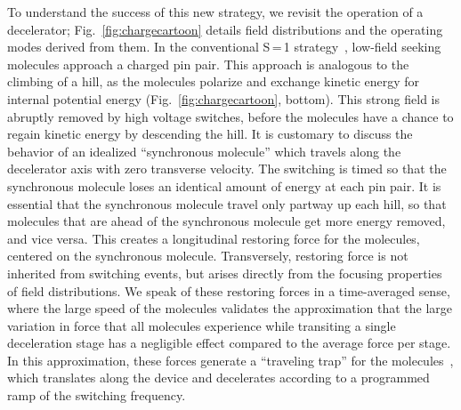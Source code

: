 \documentclass[%
 reprint,
 amsmath,amssymb,
 aps,
prl,
]{revtex4-1}
\begin{document}
To understand the success of this new strategy, we revisit the operation of a decelerator; Fig.~\ref{fig:chargecartoon} details field distributions and the operating modes derived from them.
In the conventional S\,=\,1 strategy~\cite{VanDeMeerakker2012}, low-field seeking molecules approach a charged pin pair. 
This approach is analogous to the climbing of a hill, as the molecules polarize and exchange kinetic energy for internal potential energy (Fig.~\ref{fig:chargecartoon}, bottom).
This strong field is abruptly removed by high voltage switches, before the molecules have a chance to regain kinetic energy by descending the hill.
It is customary to discuss the behavior of an idealized ``synchronous molecule'' which travels along the decelerator axis with zero transverse velocity.
The switching is timed so that the synchronous molecule loses an identical amount of energy at each pin pair.
It is essential that the synchronous molecule travel only partway up each hill, so that molecules that are ahead of the synchronous molecule get more energy removed, and vice versa.
This creates a longitudinal restoring force for the molecules, centered on the synchronous molecule.
Transversely, restoring force is not inherited from switching events, but arises directly from the focusing properties of field distributions.
We speak of these restoring forces in a time-averaged sense, where the large speed of the molecules validates the approximation that the large variation in force that all molecules experience while transiting a single deceleration stage has a negligible effect compared to the average force per stage.
In this approximation, these forces generate a ``traveling trap'' for the molecules~\cite{Bethlem2000}, which translates along the device and decelerates according to a programmed ramp of the switching frequency.
\end{document}
